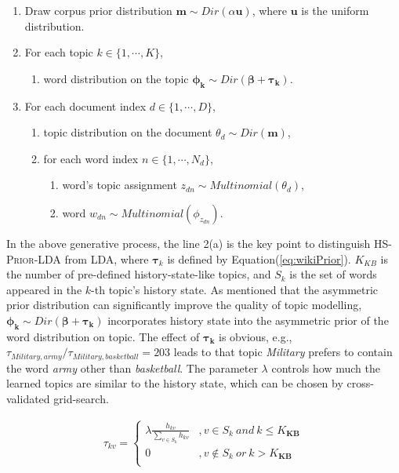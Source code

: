 \documentclass{article}
\begin{document}
\begin{enumerate}[itemsep=0mm]
\item Draw corpus prior distribution \(\bm{m} \sim Dir(\alpha \bm{u})\), where \(\bm{u}\) is the uniform distribution.
\item For each topic \(k \in \{1,\cdots,K\}\), 
\begin{enumerate}[itemsep=0mm]
\item word distribution on the topic \(\bm{\phi_k} \sim Dir(\bm{\beta}+ \bm{\tau_k})\).
\end{enumerate}
\item For each document index \(d \in \{1,\cdots,D\}\),
\begin{enumerate}[itemsep=0mm]
\item topic distribution on the document \(\theta_d \sim Dir(\bm{m})\),
\item for each word index \(n \in \{1,\cdots,N_d\}\),
\begin{enumerate}[itemsep=0mm]
\item word's topic assignment \(z_{dn} \sim Multinomial(\theta_d)\), 
\item word \(w_{dn} \sim Multinomial(\phi_{z_{dn}})\). 
\end{enumerate}
\end{enumerate}

\end{enumerate}

In the above generative process, the line 2(a) is the key point to distinguish \textsc{HS-Prior-LDA} from LDA\cite{blei2003latent}, where \(\bm{\tau}_k\) is defined by Equation(\ref{eq:wikiPrior}).
\(K_{KB}\) is the number of pre-defined history-state-like topics, and \(S_k\) is the set of words appeared in the \(k\)-th topic's history state.
As \cite{wallach2008structured} mentioned that the asymmetric prior distribution can significantly improve the quality of topic modelling, \(\bm{\phi_k} \sim Dir(\bm{\beta}+ \bm{\tau_k})\) incorporates history state into the asymmetric prior of the word distribution on topic. 
The effect of \(\bm{\tau_k}\) is obvious, e.g., \(\tau_{Military,army}/\tau_{Military,basketball}=203\) leads to that topic \textit{Military} prefers to contain the word \textit{army} other than \textit{basketball}.
The parameter \(\lambda\) controls how much the learned topics are similar to the history state, which can be chosen by cross-validated grid-search. 

\begin{scriptsize}
\begin{equation}
\label{eq:wikiPrior}
\begin{aligned}
\tau_{kv}=
\left\{ \begin{aligned}
\lambda \frac{h_{kv}}{\sum_{v\in S_{k}}h_{kv}} &,v\in S_{k}\ and  \ k \leq K_{\bm{KB}} \\
0&,v \notin S_{k} \ or \ k > K_{\bm{KB}} \\
\end{aligned}\right.
\end{aligned}
\end{equation}
\end{scriptsize}
\end{document}
